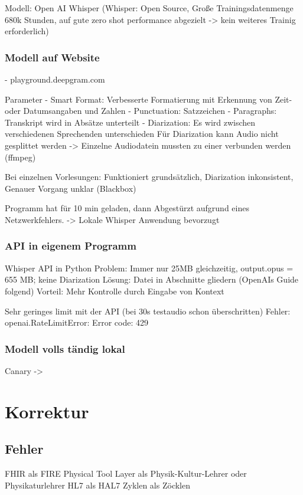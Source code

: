 Modell: Open AI Whisper \citep{whisper}
(Whisper: Open Source, Große Trainingsdatenmenge 680k Stunden, auf gute zero shot performance abgezielt -> kein weiteres Trainig erforderlich)

\subsubsection{Modell auf Website}

- playground.deepgram.com

Parameter
- Smart Format: Verbesserte Formatierung mit Erkennung von Zeit- oder Datumsangaben und Zahlen
- Punctuation: Satzzeichen
- Paragraphs: Transkript wird in Absätze unterteilt
- Diarization: Es wird zwischen verschiedenen Sprechenden unterschieden
Für Diarization kann Audio nicht gesplittet werden -> Einzelne Audiodatein mussten zu einer verbunden werden (ffmpeg)

Bei einzelnen Vorlesungen: Funktioniert grundsätzlich, Diarization inkonsistent, Genauer Vorgang unklar (Blackbox)

Programm hat für 10 min geladen, dann Abgestürzt aufgrund eines Netzwerkfehlers.
-> Lokale Whisper Anwendung bevorzugt


\subsubsection{API in eigenem Programm}

Whisper API in Python 
Problem: Immer nur 25MB gleichzeitig, output.opus  = 655 MB; keine Diarization 
Lösung: Datei in Abschnitte gliedern (OpenAIs Guide folgend)
Vorteil: Mehr Kontrolle durch Eingabe von Kontext

Sehr geringes limit mit der API (bei 30s testaudio schon überschritten)
Fehler: openai.RateLimitError: Error code: 429

\subsubsection{Modell volls
tändig lokal}
Canary  ->



\section{Korrektur}
\subsection{Fehler}
FHIR als FIRE
Physical Tool Layer als Physik-Kultur-Lehrer oder Physikaturlehrer
HL7 als HAL7
Zyklen als Zöcklen

